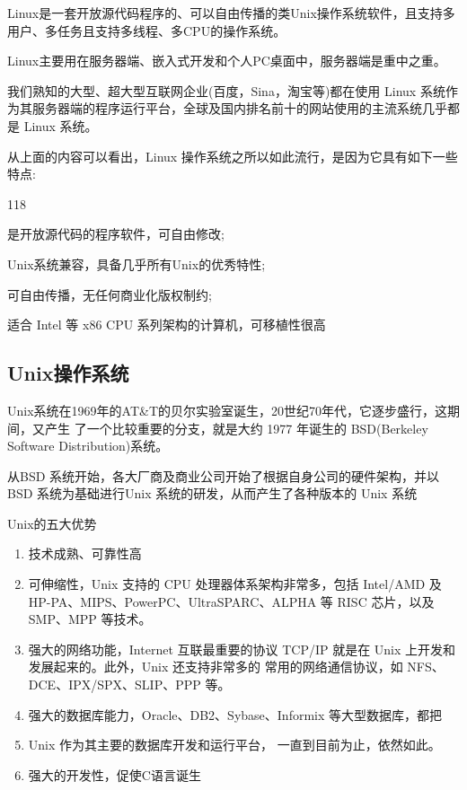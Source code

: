 Linux是一套开放源代码程序的、可以自由传播的类Unix操作系统软件，且支持多用户、多任务且支持多线程、多CPU的操作系统。

Linux主要用在服务器端、嵌入式开发和个人PC桌面中，服务器端是重中之重。

我们熟知的大型、超大型互联网企业(百度，Sina，淘宝等)都在使用 Linux 系统作为其服务器端的程序运行平台，全球及国内排名前十的网站使用的主流系统几乎都是 Linux 系统。

从上面的内容可以看出，Linux 操作系统之所以如此流行，是因为它具有如下一些特点:
\begin{dinglist}{118}
\item 是开放源代码的程序软件，可自由修改;
\item Unix系统兼容，具备几乎所有Unix的优秀特性;
\item 可自由传播，无任何商业化版权制约;
\item 适合 Intel 等 x86 CPU 系列架构的计算机，可移植性很高
\end{dinglist}

\subsection{Unix操作系统}
Unix系统在1969年的AT\&T的贝尔实验室诞生，20世纪70年代，它逐步盛行，这期间，又产生 了一个比较重要的分支，就是大约 1977 年诞生的 BSD(Berkeley Software Distribution)系统。

从BSD 系统开始，各大厂商及商业公司开始了根据自身公司的硬件架构，并以 BSD 系统为基础进行Unix 系统的研发，从而产生了各种版本的 Unix 系统

\begin{ascolorbox17}{Unix的五大优势}
\begin{enumerate}
	\item 技术成熟、可靠性高
	\item 可伸缩性，Unix 支持的 CPU 处理器体系架构非常多，包括 Intel/AMD 及 HP-PA、MIPS、PowerPC、UltraSPARC、ALPHA 等 RISC 芯片，以及 SMP、MPP 等技术。
	\item 强大的网络功能，Internet 互联最重要的协议 TCP/IP 就是在 Unix 上开发和发展起来的。此外，Unix 还支持非常多的 常用的网络通信协议，如 NFS、DCE、IPX/SPX、SLIP、PPP 等。
	\item 强大的数据库能力，Oracle、DB2、Sybase、Informix 等大型数据库，都把 \item Unix 作为其主要的数据库开发和运行平台， 一直到目前为止，依然如此。
	\item 强大的开发性，促使C语言诞生
\end{enumerate}
\end{ascolorbox17}

